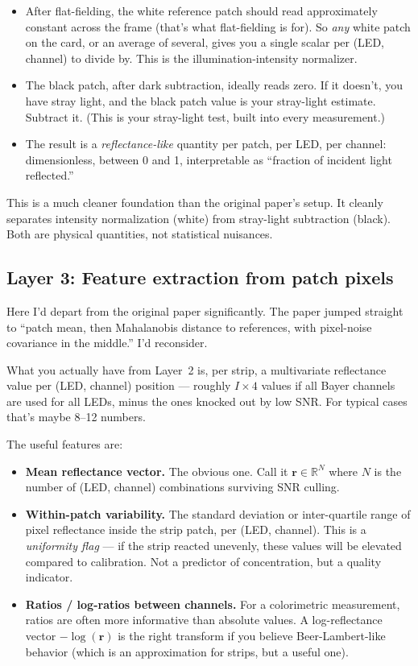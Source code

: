 \documentclass[11pt,letterpaper]{article}
\begin{document}
\begin{itemize}
  \item After flat-fielding, the white reference patch should read
    approximately constant across the frame (that's what flat-fielding is
    for). So \emph{any} white patch on the card, or an average of several,
    gives you a single scalar per (LED, channel) to divide by. This is the
    illumination-intensity normalizer.
  \item The black patch, after dark subtraction, ideally reads zero. If it
    doesn't, you have stray light, and the black patch value is your
    stray-light estimate. Subtract it. (This is your stray-light test,
    built into every measurement.)
  \item The result is a \emph{reflectance-like} quantity per patch, per LED,
    per channel: dimensionless, between 0 and 1, interpretable as
    ``fraction of incident light reflected.''
\end{itemize}

This is a much cleaner foundation than the original paper's setup. It
cleanly separates intensity normalization (white) from stray-light
subtraction (black). Both are physical quantities, not statistical
nuisances.

\subsection*{Layer 3: Feature extraction from patch pixels}

Here I'd depart from the original paper significantly. The paper jumped
straight to ``patch mean, then Mahalanobis distance to references, with
pixel-noise covariance in the middle.'' I'd reconsider.

What you actually have from Layer~2 is, per strip, a multivariate
reflectance value per (LED, channel) position --- roughly $I\times 4$ values
if all Bayer channels are used for all LEDs, minus the ones knocked out by
low SNR. For typical cases that's maybe 8--12 numbers.

The useful features are:

\begin{itemize}
  \item \textbf{Mean reflectance vector.} The obvious one. Call it
    $\mathbf{r}\in\mathbb{R}^N$ where $N$ is the number of (LED, channel)
    combinations surviving SNR culling.
  \item \textbf{Within-patch variability.} The standard deviation or
    inter-quartile range of pixel reflectance inside the strip patch, per
    (LED, channel). This is a \emph{uniformity flag} --- if the strip
    reacted unevenly, these values will be elevated compared to
    calibration. Not a predictor of concentration, but a quality indicator.
  \item \textbf{Ratios / log-ratios between channels.} For a colorimetric
    measurement, ratios are often more informative than absolute values. A
    log-reflectance vector $-\log(\mathbf{r})$ is the right transform if
    you believe Beer-Lambert-like behavior (which is an approximation for
    strips, but a useful one).
\end{itemize}
\end{document}
